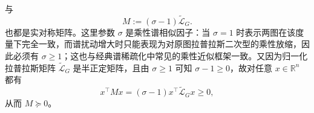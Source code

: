 与
\begin{equation}
  M
  :=
  (\sigma-1)\tilde{\mathcal{L}}_G.
\end{equation}
也都是实对称矩阵。这里参数 $\sigma$ 是乘性谱相似因子：当 $\sigma=1$ 时表示两图在该度量下完全一致，而谱扰动增大时只能表现为对原图拉普拉斯二次型的乘性放缩，因此必须有 $\sigma\ge 1$；这也与经典谱稀疏化中常见的乘性近似框架一致\cite{Spielman2011EffectiveResistances,Spielman2011SpectralSparsification,Batson2013SpectralSparsificationSurvey}。又因为归一化拉普拉斯矩阵 $\tilde{\mathcal{L}}_G$ 是半正定矩阵\cite{Chung1997}，且由 $\sigma\ge 1$ 可知 $\sigma-1\ge 0$，故对任意 $x\in\mathbb{R}^n$ 都有
\begin{equation}
  x^\top M x
  =
  (\sigma-1)x^\top \tilde{\mathcal{L}}_G x
  \ge 0,
  \label{eq:ch5-M-psd-proof}
\end{equation}
从而 $M\succeq 0$。

